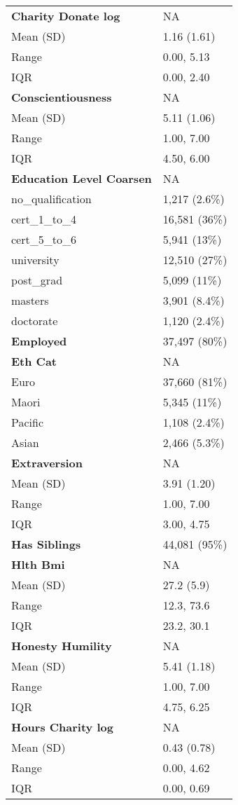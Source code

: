 \documentclass[
  singlecolumn]{article}
\begin{document}
\begin{longtable}[]{@{}ll@{}}
\textbf{Charity Donate log} & NA \\
Mean (SD) & 1.16 (1.61) \\
Range & 0.00, 5.13 \\
IQR & 0.00, 2.40 \\
\textbf{Conscientiousness} & NA \\
Mean (SD) & 5.11 (1.06) \\
Range & 1.00, 7.00 \\
IQR & 4.50, 6.00 \\
\textbf{Education Level Coarsen} & NA \\
no\_qualification & 1,217 (2.6\%) \\
cert\_1\_to\_4 & 16,581 (36\%) \\
cert\_5\_to\_6 & 5,941 (13\%) \\
university & 12,510 (27\%) \\
post\_grad & 5,099 (11\%) \\
masters & 3,901 (8.4\%) \\
doctorate & 1,120 (2.4\%) \\
\textbf{Employed} & 37,497 (80\%) \\
\textbf{Eth Cat} & NA \\
Euro & 37,660 (81\%) \\
Maori & 5,345 (11\%) \\
Pacific & 1,108 (2.4\%) \\
Asian & 2,466 (5.3\%) \\
\textbf{Extraversion} & NA \\
Mean (SD) & 3.91 (1.20) \\
Range & 1.00, 7.00 \\
IQR & 3.00, 4.75 \\
\textbf{Has Siblings} & 44,081 (95\%) \\
\textbf{Hlth Bmi} & NA \\
Mean (SD) & 27.2 (5.9) \\
Range & 12.3, 73.6 \\
IQR & 23.2, 30.1 \\
\textbf{Honesty Humility} & NA \\
Mean (SD) & 5.41 (1.18) \\
Range & 1.00, 7.00 \\
IQR & 4.75, 6.25 \\
\textbf{Hours Charity log} & NA \\
Mean (SD) & 0.43 (0.78) \\
Range & 0.00, 4.62 \\
IQR & 0.00, 0.69 \\

\end{longtable}
\end{document}
